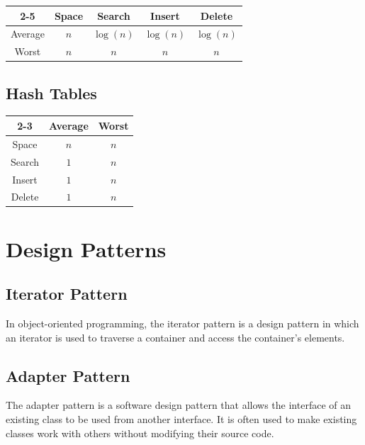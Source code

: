 \documentclass[a4paper, 12pt]{article}
\begin{document}
\begin{center}	
\begin{tabular}{| c | c | c | c | c |}
\cline{2-5}
\multicolumn{1}{c |}{} & Space & Search & Insert & Delete \\
\hline
Average & $n$ & $\log(n)$ & $\log(n)$ & $\log(n)$ \\
\hline
Worst & $n$ & $n$ & $n$ & $n$ \\
\hline
\end{tabular}
\end{center}
	
	\subsection{Hash Tables}
	
\begin{center}
\begin{tabular}{| c | c | c |}
\cline{2-3}
\multicolumn{1}{c |}{} & Average & Worst \\
\hline
Space & $n$ & $n$ \\
\hline
Search & $1$ & $n$ \\
\hline
Insert & $1$ & $n$ \\
\hline
Delete & $1$ & $n$ \\
\hline
\end{tabular}
\end{center}

\section{Design Patterns}

	\subsection{Iterator Pattern}
	
In object-oriented programming, the iterator pattern is a design pattern in which an iterator is used to traverse a container and access the container's elements.

	\subsection{Adapter Pattern}
	
The adapter pattern is a software design pattern that allows the interface of an existing class to be used from another interface. It is often used to make existing classes work with others without modifying their source code.
\end{document}
